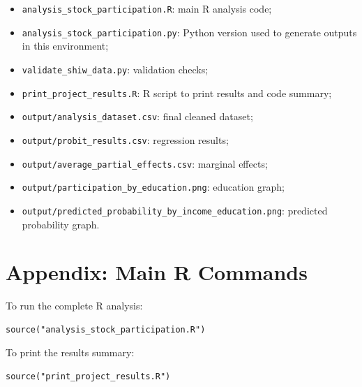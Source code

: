 \documentclass[12pt]{article}
\begin{document}
\begin{itemize}[leftmargin=*]
    \item \texttt{analysis\_stock\_participation.R}: main R analysis code;
    \item \texttt{analysis\_stock\_participation.py}: Python version used to generate outputs in this environment;
    \item \texttt{validate\_shiw\_data.py}: validation checks;
    \item \texttt{print\_project\_results.R}: R script to print results and code summary;
    \item \texttt{output/analysis\_dataset.csv}: final cleaned dataset;
    \item \texttt{output/probit\_results.csv}: regression results;
    \item \texttt{output/average\_partial\_effects.csv}: marginal effects;
    \item \texttt{output/participation\_by\_education.png}: education graph;
    \item \texttt{output/predicted\_probability\_by\_income\_education.png}: predicted probability graph.
\end{itemize}

\section{Appendix: Main R Commands}

To run the complete R analysis:

\begin{verbatim}
source("analysis_stock_participation.R")
\end{verbatim}

To print the results summary:

\begin{verbatim}
source("print_project_results.R")
\end{verbatim}
\end{document}
